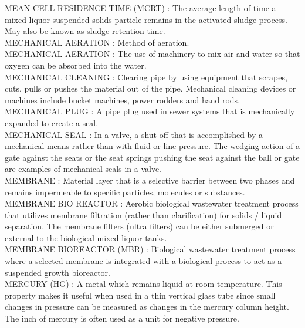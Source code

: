 \vspace{0.15cm}
MEAN CELL RESIDENCE TIME (MCRT) :  The average length of time a mixed liquor suspended solids particle remains in the activated sludge process. May also be known as sludge retention time. \\
\vspace{0.15cm}
MECHANICAL AERATION :   Method of aeration.\\
\vspace{0.15cm}
MECHANICAL AERATION :  The use of machinery to mix air and water so that oxygen can be absorbed into the water.\\
\vspace{0.15cm}
MECHANICAL CLEANING :  Clearing pipe by using equipment that scrapes, cuts, pulls or pushes the material out of the pipe. Mechanical cleaning devices or machines include bucket machines, power rodders and hand rods. \\
\vspace{0.15cm}
MECHANICAL PLUG :  A pipe plug used in sewer systems that is mechanically expanded to create a seal. \\
\vspace{0.15cm}
MECHANICAL SEAL :   In a valve, a shut off that is accomplished by a mechanical means rather than with fluid or line pressure. The wedging action of a gate against the seats or the seat springs pushing the seat against the ball or gate are examples of mechanical seals in a valve.\\
\vspace{0.15cm}
MEMBRANE :  Material layer that is a selective barrier between two phases and remains impermeable to specific particles, molecules or substances.\\
\vspace{0.15cm}
MEMBRANE BIO REACTOR :  Aerobic biological wastewater treatment process that utilizes membrane filtration (rather than clarification) for solids / liquid separation. The membrane filters (ultra filters) can be either submerged or external to the biological mixed liquor tanks.\\
\vspace{0.15cm}
MEMBRANE BIOREACTOR (MBR) :   Biological wastewater treatment process where a selected membrane is integrated with a biological process to act as a suspended growth bioreactor.\\
\vspace{0.15cm}
MERCURY (HG) :   A metal which remains liquid at room temperature. This property makes it useful when used in a thin vertical glass tube since small changes in pressure can be measured as changes in the mercury column height. The inch of mercury is often used as a unit for negative pressure.\\
